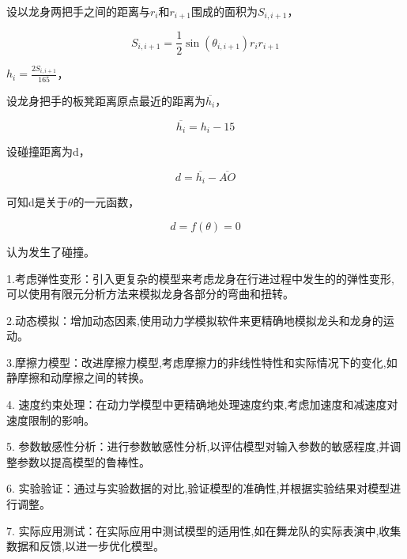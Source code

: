 设以龙身两把手之间的距离与$r_i$和$r_{i+1}$围成的面积为$S_{i,i+1}$，

\begin{equation}
	S_{i,i+1} = \frac{1}{2} \sin(\theta_{i,i+1}) r_i r_{i+1}
\end{equation}

$h_i = \frac{2S_{i,i+1}}{165}$，

设龙身把手的板凳距离原点最近的距离为$\overline{h_i}$，

\begin{equation}
	\overline{h_i} = h_i - 15
\end{equation}

设碰撞距离为d，

\begin{equation}
	d = \overline{h_i} - \overline{AO}
\end{equation}

可知d是关于$\theta$的一元函数，

\begin{equation}
	d = f(\theta) = 0
\end{equation}

认为发生了碰撞。


1.考虑弹性变形：引入更复杂的模型来考虑龙身在行进过程中发生的的弹性变形,可以使用有限元分析方法来模拟龙身各部分的弯曲和扭转。

2.动态模拟：增加动态因素,使用动力学模拟软件来更精确地模拟龙头和龙身的运动。

3.摩擦力模型：改进摩擦力模型,考虑摩擦力的非线性特性和实际情况下的变化,如静摩擦和动摩擦之间的转换。

4. 速度约束处理：在动力学模型中更精确地处理速度约束,考虑加速度和减速度对速度限制的影响。

5. 参数敏感性分析：进行参数敏感性分析,以评估模型对输入参数的敏感程度,并调整参数以提高模型的鲁棒性。

6. 实验验证：通过与实验数据的对比,验证模型的准确性,并根据实验结果对模型进行调整。

7. 实际应用测试：在实际应用中测试模型的适用性,如在舞龙队的实际表演中,收集数据和反馈,以进一步优化模型。